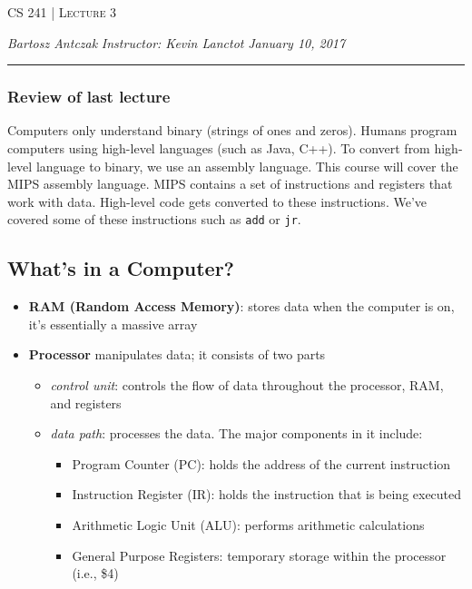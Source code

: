 \documentclass{report}
\newcommand{\lectureNum}{3}
\newcommand{\curDate}{January 10, 2017}
\newcommand{\course}{CS 241}
\newcommand{\instructor}{Kevin Lanctot}
\begin{document}
\begin{center}
\begin{Large}
\textsc{\course{} | Lecture \lectureNum{}}
\end{Large}
\end{center} 
\noindent \textit{Bartosz Antczak} \hfill
\textit{Instructor: \instructor{}} \hfill
\textit{\curDate{}}
\rule{\textwidth}{0.4pt}
\subsubsection{Review of last lecture}
Computers only understand binary (strings of ones and zeros). Humans program computers using high-level languages (such as Java, C++). To convert from high-level language to binary, we use an assembly language. This course will cover the MIPS assembly language. MIPS contains a set of instructions and registers that work with data. High-level code gets converted to these instructions. We've covered some of these instructions such as \texttt{add} or \texttt{jr}.
\subsection{What's in a Computer?}
\begin{itemize}
\item \textbf{RAM (Random Access Memory)}: stores data when the computer is on, it's essentially a massive array
\item \textbf{Processor} manipulates data; it consists of two parts
\begin{itemize}
\item \textit{control unit}: controls the flow of data throughout the processor, RAM, and registers
\item \textit{data path}: processes the data. The major components in it include:
\begin{itemize}
\item Program Counter (PC): holds the address of the current instruction
\item Instruction Register (IR): holds the instruction that is being executed
\item Arithmetic Logic Unit (ALU): performs arithmetic calculations
\item General Purpose Registers: temporary storage within the processor (i.e., \$4)
\end{itemize} 
\end{itemize}
\end{itemize}
\end{document}
